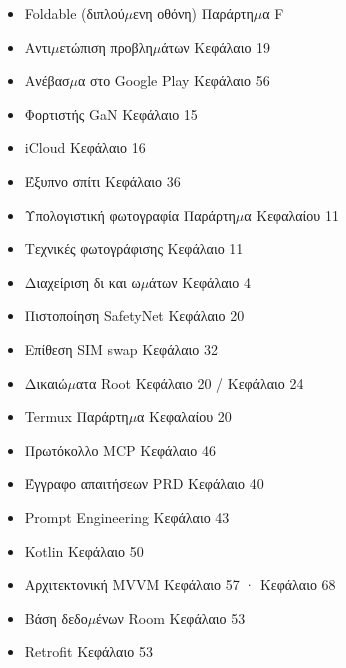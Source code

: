
\begin{itemize}
  \item Foldable (διπλού$\mu$ενη οθόνη) Παράρτη$\mu$α F
  \item Αντι$\mu$ετώπιση προβλη$\mu$άτων Κεφάλαιο 19
  \item Ανέβασ$\mu$α στο Google Play Κεφάλαιο 56
  \item Φορτιστής GaN Κεφάλαιο 15
  \item iCloud Κεφάλαιο 16
  \item Έξυπνο σπίτι Κεφάλαιο 36
  \item Υπολογιστική φωτογραφία Παράρτη$\mu$α Κεφαλαίου 11
\end{itemize}


\begin{itemize}
  \item Τεχνικές φωτογράφισης Κεφάλαιο 11
  \item Διαχείριση δι και ω$\mu$άτων Κεφάλαιο 4
  \item Πιστοποίηση SafetyNet Κεφάλαιο 20
  \item Επίθεση SIM swap Κεφάλαιο 32
  \item Δικαιώ$\mu$ατα Root Κεφάλαιο 20 / Κεφάλαιο 24
  \item Termux Παράρτη$\mu$α Κεφαλαίου 20
  \item Πρωτόκολλο MCP Κεφάλαιο 46
  \item Έγγραφο απαιτήσεων PRD Κεφάλαιο 40
  \item Prompt Engineering Κεφάλαιο 43
  \item Kotlin Κεφάλαιο 50
  \item Αρχιτεκτονική MVVM Κεφάλαιο 57 · Κεφάλαιο 68
  \item Βάση δεδο$\mu$ένων Room Κεφάλαιο 53
  \item Retrofit Κεφάλαιο 53
\end{itemize}


